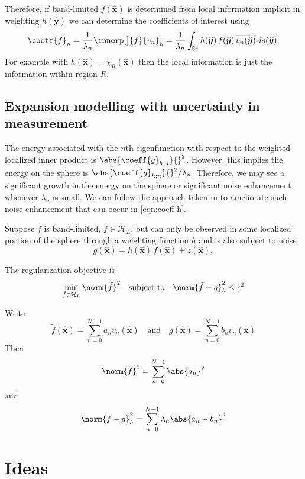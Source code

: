 \documentclass[10pt, twocolumn, twoside]{IEEEtran}
\newcommand{\untsph}{\mathbb{S}^{2}} %
\newcommand{\unit}[1]{\widehat{\bm{#1}}}
\newcommand{\conj}[1]{\overline{#1}} %
\begin{document}
Therefore, if band-limited $f(\unit{x})$ is determined from local information implicit in weighting $h(\unit{y})$ we can determine the coefficients of interest using
\begin{equation}
\label{eqn:coeff-h}
	\coeff{f}_n
	=\frac{1}{\lambda_n}\innerp[\big]{f}{v_n}_h
	=\frac{1}{\lambda_n}\int_{\untsph}h(\unit{y})\,f(\unit{y})\,\conj{v_n(\unit{y})}\,ds(\unit{y}).
\end{equation}
For example with $h(\unit{x})=\chi^{}_{R}(\unit{x})$ then the local information is just the information within region $R$.

\subsection{Expansion modelling with uncertainty in measurement}
\label{sec:emwuim}

The energy associated with the $n$th eigenfunction with respect to the weighted localized inner product is $\abs{\coeff{g}_{h;n}}{}^2$.  However, this implies the energy on the sphere is $\abs{\coeff{g}_{h;n}}{}^2/\lambda_n$.  Therefore, we may see a significant growth in the energy on the sphere or significant noise enhancement whenever $\lambda_n$ is small.  We can follow the approach taken in \cite{KennedyC2014c} to ameliorate such noise enhancement that can occur in \eqref{eqn:coeff-h}.  %

Suppose $f$ is band-limited, $f\in\mathcal{H}_L$, but can only be observed in some localized portion of the sphere through a weighting function $h$ and is also subject to noise
\[
	g(\unit{x})=h(\unit{x})\,f(\unit{x})+z(\unit{x}),
\]

The regularization objective is
\[
	\min_{\tilde{f}\in\mathcal{H}_L} \norm{\tilde{f}}^2\quad\text{subject to}\quad \norm{\tilde{f}-g}_h^2\leq\epsilon^2
\]

\newpage
Write
\[
	\tilde{f}(\unit{x})=\sum_{n=0}^{N-1} a_nv_n(\unit{x})\quad\text{and}\quad
	g(\unit{x})=\sum_{n=0}^{N-1} b_nv_n(\unit{x})
\]
Then
\[
	\norm{\tilde{f}}^2=\sum_{n=0}^{N-1} \abs{a_n}^2
\]
and
\[
	\norm{\tilde{f}-g}_h^2=\sum_{n=0}^{N-1} \lambda_n\abs{a_n-b_n}^2
\]

\section{Ideas}
\end{document}
